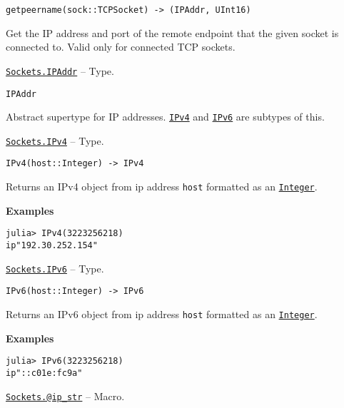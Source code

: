\begin{adjustwidth}{2em}{0pt}


\begin{verbatim}
getpeername(sock::TCPSocket) -> (IPAddr, UInt16)
\end{verbatim}

Get the IP address and port of the remote endpoint that the given socket is connected to. Valid only for connected TCP sockets.



\end{adjustwidth}
\hypertarget{8098410990676145612}{} 
\hyperlink{8098410990676145612}{\texttt{Sockets.IPAddr}}  -- {Type.}

\begin{adjustwidth}{2em}{0pt}


\begin{verbatim}
IPAddr
\end{verbatim}

Abstract supertype for IP addresses. \hyperlink{3367105148999996858}{\texttt{IPv4}} and \hyperlink{14863381148391509384}{\texttt{IPv6}} are subtypes of this.



\end{adjustwidth}
\hypertarget{3367105148999996858}{} 
\hyperlink{3367105148999996858}{\texttt{Sockets.IPv4}}  -- {Type.}

\begin{adjustwidth}{2em}{0pt}


\begin{verbatim}
IPv4(host::Integer) -> IPv4
\end{verbatim}

Returns an IPv4 object from ip address \texttt{host} formatted as an \hyperlink{8469131683393450448}{\texttt{Integer}}.

\textbf{Examples}


\begin{verbatim}
julia> IPv4(3223256218)
ip"192.30.252.154"
\end{verbatim}



\end{adjustwidth}
\hypertarget{14863381148391509384}{} 
\hyperlink{14863381148391509384}{\texttt{Sockets.IPv6}}  -- {Type.}

\begin{adjustwidth}{2em}{0pt}


\begin{verbatim}
IPv6(host::Integer) -> IPv6
\end{verbatim}

Returns an IPv6 object from ip address \texttt{host} formatted as an \hyperlink{8469131683393450448}{\texttt{Integer}}.

\textbf{Examples}


\begin{verbatim}
julia> IPv6(3223256218)
ip"::c01e:fc9a"
\end{verbatim}



\end{adjustwidth}
\hypertarget{5293313767861803133}{} 
\hyperlink{5293313767861803133}{\texttt{Sockets.@ip\_str}}  -- {Macro.}

